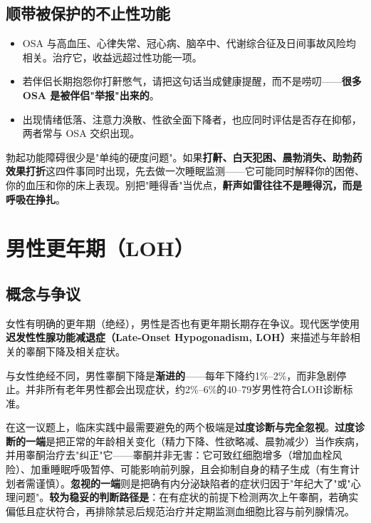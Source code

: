 \subsection{顺带被保护的不止性功能}

\begin{itemize}
	\item OSA 与高血压、心律失常、冠心病、脑卒中、代谢综合征及日间事故风险均相关。治疗它，收益远超过性功能一项。
	\item 若伴侣长期抱怨你打鼾憋气，请把这句话当成健康提醒，而不是唠叨——\textbf{很多 OSA 是被伴侣"举报"出来的}。
	\item 出现情绪低落、注意力涣散、性欲全面下降者，也应同时评估是否存在抑郁，两者常与 OSA 交织出现。
\end{itemize}

\begin{tcolorbox}[colback=pink!5!white,colframe=red!50!black,title=贴心小叮咛]
勃起功能障碍很少是"单纯的硬度问题"。如果\textbf{打鼾、白天犯困、晨勃消失、助勃药效果打折}这四件事同时出现，先去做一次睡眠监测——它可能同时解释你的困倦、你的血压和你的床上表现。别把"睡得香"当优点，\textbf{鼾声如雷往往不是睡得沉，而是呼吸在挣扎}。
\end{tcolorbox}

\section{男性更年期（LOH）}
\label{sec:male_menopause}

\subsection{概念与争议}

女性有明确的更年期（绝经），男性是否也有更年期长期存在争议。现代医学使用\textbf{迟发性性腺功能减退症（Late-Onset Hypogonadism, LOH）}来描述与年龄相关的睾酮下降及相关症状。

与女性绝经不同，男性睾酮下降是\textbf{渐进的}——每年下降约1\%--2\%，而非急剧停止。并非所有老年男性都会出现症状，约2\%--6\%的40--79岁男性符合LOH诊断标准。


在这一议题上，临床实践中最需要避免的两个极端是\textbf{过度诊断与完全忽视}。\textbf{过度诊断的一端}是把正常的年龄相关变化（精力下降、性欲略减、晨勃减少）当作疾病，并用睾酮治疗去"纠正"它——睾酮并非无害：它可致红细胞增多（增加血栓风险）、加重睡眠呼吸暂停、可能影响前列腺，且会抑制自身的精子生成（有生育计划者需谨慎）。\textbf{忽视的一端}则是把确有内分泌缺陷者的症状归因于"年纪大了"或"心理问题"。\textbf{较为稳妥的判断路径是}：在有症状的前提下检测两次上午睾酮，若确实偏低且症状符合，再排除禁忌后规范治疗并定期监测血细胞比容与前列腺情况。

